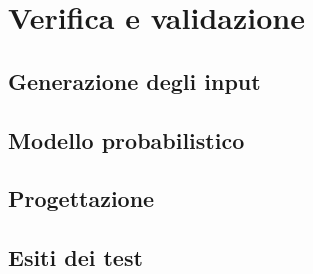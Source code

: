 
\chapter{Verifica e validazione}
\label{cap:verifica-validazione}
\section{Generazione degli input}
\label{sec:input}

\section{Modello probabilistico}
\label{sec:prob}

\section{Progettazione}
\label{sec:prog}

\section{Esiti dei test}
\label{sec:test}